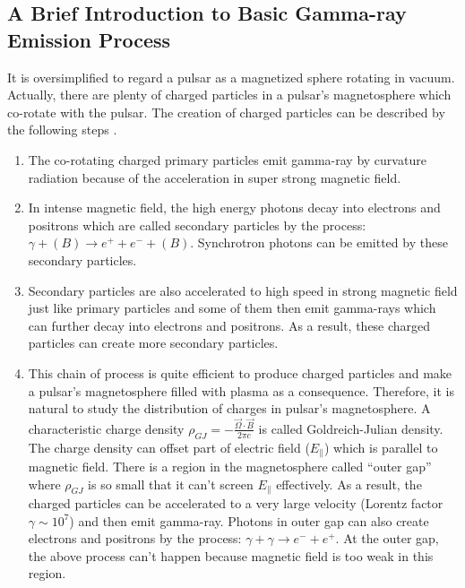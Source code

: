 \documentclass[12pt]{report}
\begin{document}
        \subsection{A Brief Introduction to Basic Gamma-ray Emission Process}
          It is oversimplified to regard a pulsar as a magnetized sphere rotating in vacuum. 
          Actually, there are plenty of charged particles in a pulsar's magnetosphere 
          which co-rotate with the pulsar. The creation of charged particles can 
          be described by the following steps \cite{Sturrock:1971zc}.
          \begin{enumerate}
            \item The co-rotating charged primary particles emit gamma-ray by curvature 
            radiation because of the acceleration in super strong magnetic field.  
            \item In intense magnetic field, the high energy photons decay into electrons and 
            positrons which are called secondary particles by the process: 
            $\gamma + (B) \rightarrow e^++e^-+(B)$. Synchrotron photons can be emitted by 
            these secondary particles. 
            \item Secondary particles are also accelerated to high speed 
            in strong magnetic field just like primary particles and some of them then emit 
            gamma-rays which can further decay into electrons and positrons.
            As a result, these charged particles can create more secondary particles.
            \item This chain of process is quite efficient to produce charged particles and 
            make a pulsar's magnetosphere filled with plasma as a consequence. 
            Therefore, it is natural to study the distribution of charges in 
            pulsar's magnetosphere. A characteristic charge density 
            $\rho_{GJ}=-\frac{\vec{\Omega}\cdot \vec{B}}{2\pi c}$ is called Goldreich-Julian 
            density. The charge density can offset part of electric field ($E_{\parallel}$) 
            which is parallel to magnetic field. There is a region in the magnetosphere 
            called ``outer gap'' where $\rho_{GJ}$ is so small that it can't screen 
            $E_{\parallel}$ effectively. As a result, the charged particles can be 
            accelerated to a very large velocity (Lorentz factor $\gamma\sim 10^7$) and then 
            emit gamma-ray. Photons in outer gap can also create electrons and positrons by 
            the process: $\gamma+\gamma\rightarrow e^-+e^+$. At the outer gap, the above process 
            can't happen because magnetic field is too weak in this region.
          \end{enumerate}
\end{document}
